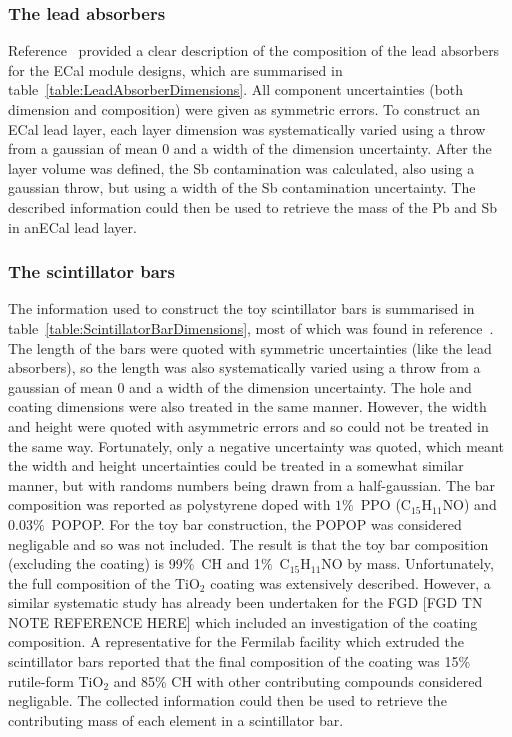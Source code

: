 \subsubsection{The lead absorbers}
\label{subsubsec:ECalMassLeadAbsorbers}
Reference~\cite{1748-0221-8-10-P10019} provided a clear description of the composition of the lead absorbers for the ECal module designs, which are summarised in table~\ref{table:LeadAbsorberDimensions}.  All component uncertainties (both dimension and composition) were given as symmetric errors.  To construct an ECal lead layer, each layer dimension was systematically varied using a throw from a gaussian of mean 0 and a width of the dimension uncertainty.  After the layer volume was defined, the Sb contamination was calculated, also using a gaussian throw, but using a width of the Sb contamination uncertainty.  The described information could then be used to retrieve the mass of the Pb and Sb in anECal lead layer.

\subsubsection{The scintillator bars}
\label{subsubsec:ECalMassSctintillatorBars}
The information used to construct the toy scintillator bars is summarised in table~\ref{table:ScintillatorBarDimensions}, most of which was found in reference~\cite{1748-0221-8-10-P10019}.  The length of the bars were quoted with symmetric uncertainties (like the lead absorbers), so the length was also systematically varied using a throw from a gaussian of mean 0 and a width of the dimension uncertainty.  The hole and coating dimensions were also treated in the same manner.  However, the width and height were quoted with asymmetric errors and so could not be treated in the same way.  Fortunately, only a negative uncertainty was quoted, which meant the width and height uncertainties could be treated in a somewhat similar manner, but with randoms numbers being drawn from a half-gaussian.  The bar composition was reported as polystyrene doped with $1\%$~PPO (C$_{15}$H$_{11}$NO) and $0.03\%$~POPOP.  For the toy bar construction, the POPOP was considered negligable and so was not included.  The result is that the toy bar composition (excluding the coating) is 99$\%$~CH and 1$\%$~C$_{15}$H$_{11}$NO by mass.  Unfortunately, the full composition of the TiO$_2$ coating was extensively described.  However, a similar systematic study has already been undertaken for the FGD [FGD TN NOTE REFERENCE HERE] which included an investigation of the coating composition.  A representative for the Fermilab facility which extruded the scintillator bars reported that the final composition of the coating was 15$\%$ rutile-form TiO$_2$ and 85$\%$ CH with other contributing compounds considered negligable.  The collected information could then be used to retrieve the contributing mass of each element in a scintillator bar.

